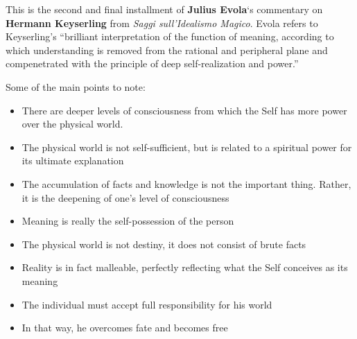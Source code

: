 \begin{quotationx}
This is the second and final installment of \textbf{Julius Evola}`s commentary on \textbf{Hermann Keyserling} from \emph{Saggi sull'Idealismo Magico}. Evola refers to Keyserling's ``brilliant interpretation of the function of meaning, according to which understanding is removed from the rational and peripheral plane and compenetrated with the principle of deep self-realization and power.''

Some of the main points to note:

\begin{itemize}


\item There are deeper levels of consciousness from which the Self has more power over the physical world.

\item The physical world is not self-sufficient, but is related to a spiritual power for its ultimate explanation

\item The accumulation of facts and knowledge is not the important thing. Rather, it is the deepening of one's level of consciousness

\item Meaning is really the self-possession of the person

\item The physical world is not destiny, it does not consist of brute facts

\item Reality is in fact malleable, perfectly reflecting what the Self conceives as its meaning

\item The individual must accept full responsibility for his world

\item In that way, he overcomes fate and becomes free
\end{itemize}
\end{quotationx}



